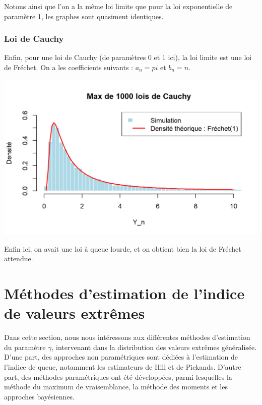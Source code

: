 \documentclass{article}
\begin{document}
\noindent Notons ainsi que l'on a la même loi limite que pour la loi exponentielle de paramètre 1, les graphes sont quasiment identiques.

\subsubsection{Loi de Cauchy}

\noindent Enfin, pour une loi de Cauchy (de paramètres 0 et 1 ici), la loi limite est une loi de Fréchet. On a les coefficients suivants : $a_n = pi $ et $b_n = n $.

\begin{center}
	\includegraphics[scale=0.8]{./images/Max_Cauchy.png} 
\end{center}

\noindent Enfin ici, on avait une loi à queue lourde, et on obtient bien la loi de Fréchet attendue.

\newpage

\section{Méthodes d'estimation de l'indice de valeurs extrêmes}
Dans cette section, nous nous intéressons aux différentes méthodes d'estimation du paramètre \(\gamma\), intervenant dans la distribution des valeurs extrêmes généralisée. \\
D'une part, des approches non paramétriques sont dédiées à l'estimation de l'indice de queue, notamment les estimateurs de Hill et de Pickands. D'autre part, des méthodes paramétriques ont été développées, parmi lesquelles la méthode du maximum de vraisemblance, la méthode des moments et les approches bayésiennes. \\
\end{document}
